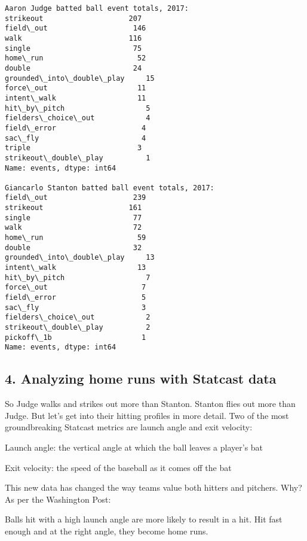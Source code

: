 \documentclass[11pt]{article}
\begin{document}
    \begin{Verbatim}[commandchars=\\\{\}]
Aaron Judge batted ball event totals, 2017: 
strikeout                    207
field\_out                    146
walk                         116
single                        75
home\_run                      52
double                        24
grounded\_into\_double\_play     15
force\_out                     11
intent\_walk                   11
hit\_by\_pitch                   5
fielders\_choice\_out            4
field\_error                    4
sac\_fly                        4
triple                         3
strikeout\_double\_play          1
Name: events, dtype: int64

Giancarlo Stanton batted ball event totals, 2017: 
field\_out                    239
strikeout                    161
single                        77
walk                          72
home\_run                      59
double                        32
grounded\_into\_double\_play     13
intent\_walk                   13
hit\_by\_pitch                   7
force\_out                      7
field\_error                    5
sac\_fly                        3
fielders\_choice\_out            2
strikeout\_double\_play          2
pickoff\_1b                     1
Name: events, dtype: int64

    \end{Verbatim}

    \hypertarget{analyzing-home-runs-with-statcast-data}{%
\subsection{4. Analyzing home runs with Statcast
data}\label{analyzing-home-runs-with-statcast-data}}

So Judge walks and strikes out more than Stanton. Stanton flies out more
than Judge. But let's get into their hitting profiles in more detail.
Two of the most groundbreaking Statcast metrics are launch angle and
exit velocity:

Launch angle: the vertical angle at which the ball leaves a player's bat

Exit velocity: the speed of the baseball as it comes off the bat

This new data has changed the way teams value both hitters and pitchers.
Why? As per the Washington Post:

Balls hit with a high launch angle are more likely to result in a hit.
Hit fast enough and at the right angle, they become home runs.
\end{document}
